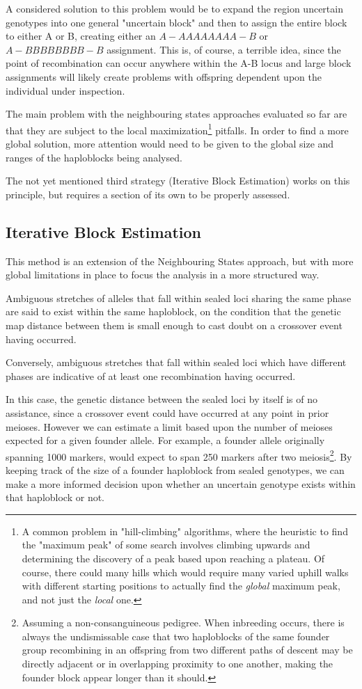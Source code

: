 A considered solution to this problem would be to expand the region uncertain genotypes into one general "uncertain block" and then to assign the entire block to either A or B, creating either an $A-AAAAAAAA-B$ or $A-BBBBBBBB-B$ assignment. This is, of course, a terrible idea, since the point of recombination can occur anywhere within the A-B locus and large block assignments will likely create problems with offspring dependent upon the individual under inspection.

The main problem with the neighbouring states approaches evaluated so far are that they are subject to the local maximization\footnote{A common problem in "hill-climbing" algorithms, where the heuristic to find the "maximum peak" of some search involves climbing upwards and determining the discovery of a peak based upon reaching a plateau. Of course, there could many hills which would require many varied uphill walks with different starting positions to actually find the \textit{global} maximum peak, and not just the \textit{local} one.} pitfalls. In order to find a more global solution, more attention would need to be given to the global size and ranges of the haploblocks being analysed.

The not yet mentioned third strategy (Iterative Block Estimation) works on this principle, but requires a section of its own to be properly assessed.


\subsection{Iterative Block Estimation}

This method is an extension of the Neighbouring States approach, but with more global limitations in place to focus the analysis in a more structured way.

Ambiguous stretches of alleles that fall within sealed loci sharing the same phase are said to exist within the same haploblock, on the condition that the genetic map distance between them is small enough to cast doubt on a crossover event having occurred. 

Conversely, ambiguous stretches that fall within sealed loci which have different phases are indicative of at least one recombination having occurred. 

In this case, the genetic distance between the sealed loci by itself is of no assistance, since a crossover event could have occurred at any point in prior meioses.  However we can estimate a limit based upon the number of meioses expected for a given founder allele. For example, a founder allele originally spanning 1000 markers, would expect to span 250 markers after two meiosis\footnote{\label{footnote:consang}Assuming a non-consanguineous pedigree. When inbreeding occurs, there is always the undismissable case that two haploblocks of the same founder group recombining in an offspring from two different paths of descent may be directly adjacent or in overlapping proximity to one another, making the founder block appear longer than it should.}. By keeping track of the size of a founder haploblock from sealed genotypes, we can make a more informed decision upon whether an uncertain genotype exists within that haploblock or not.


